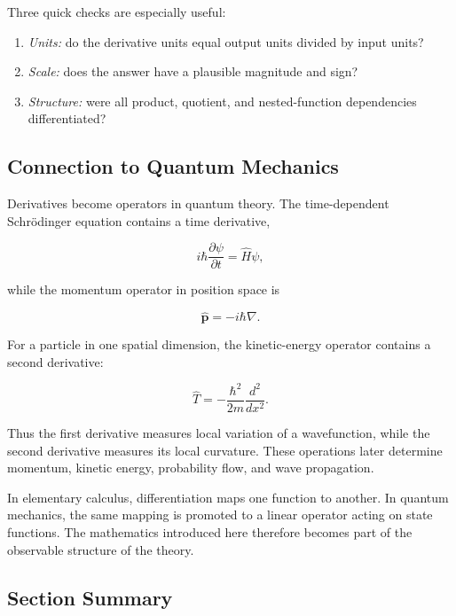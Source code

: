 Three quick checks are especially useful:

\begin{enumerate}
\item \emph{Units:} do the derivative units equal output units divided by input units?
\item \emph{Scale:} does the answer have a plausible magnitude and sign?
\item \emph{Structure:} were all product, quotient, and nested-function dependencies differentiated?
\end{enumerate}

\subsection{Connection to Quantum Mechanics}

Derivatives become operators in quantum theory. The time-dependent Schrödinger equation contains a time derivative,

\begin{equation}
 i\hbar\frac{\partial\psi}{\partial t}=\hat H\psi,
\label{eq:schrodinger-preview-derivative}
\end{equation}

while the momentum operator in position space is

\begin{equation}
\boxed{
\hat{\mathbf p}=-i\hbar\nabla.
}
\label{eq:momentum-operator-preview}
\end{equation}

For a particle in one spatial dimension, the kinetic-energy operator contains a second derivative:

\[
\hat T
=-\frac{\hbar^2}{2m}\frac{d^2}{dx^2}.
\]

Thus the first derivative measures local variation of a wavefunction, while the second derivative measures its local curvature. These operations later determine momentum, kinetic energy, probability flow, and wave propagation.

\begin{bookinsight}
In elementary calculus, differentiation maps one function to another. In quantum mechanics, the same mapping is promoted to a linear operator acting on state functions. The mathematics introduced here therefore becomes part of the observable structure of the theory.
\end{bookinsight}

\subsection{Section Summary}

